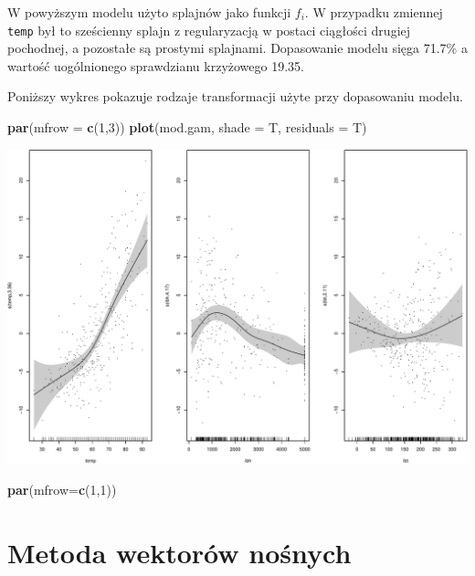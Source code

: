 \documentclass[
]{book}
\newenvironment{Shaded}{\begin{snugshade}}{\end{snugshade}}
\newcommand{\AttributeTok}[1]{\textcolor[rgb]{0.13,0.29,0.53}{#1}}
\newcommand{\DecValTok}[1]{\textcolor[rgb]{0.00,0.00,0.81}{#1}}
\newcommand{\FunctionTok}[1]{\textcolor[rgb]{0.13,0.29,0.53}{\textbf{#1}}}
\newcommand{\NormalTok}[1]{#1}
\theoremstyle{plain}
\theoremstyle{definition}
\theoremstyle{definition}
\theoremstyle{definition}
\theoremstyle{definition}
\theoremstyle{definition}
\theoremstyle{remark}
\begin{document}
W powyższym modelu użyto splajnów jako funkcji \(f_i\). W przypadku zmiennej \texttt{temp} był to sześcienny splajn z regularyzacją w postaci ciągłości drugiej pochodnej, a pozostałe są prostymi splajnami. Dopasowanie modelu sięga 71.7\% a wartość uogólnionego sprawdzianu krzyżowego 19.35.

Poniższy wykres pokazuje rodzaje transformacji użyte przy dopasowaniu modelu.

\begin{Shaded}
\begin{Highlighting}[]
\FunctionTok{par}\NormalTok{(}\AttributeTok{mfrow =} \FunctionTok{c}\NormalTok{(}\DecValTok{1}\NormalTok{,}\DecValTok{3}\NormalTok{))}
\FunctionTok{plot}\NormalTok{(mod.gam, }\AttributeTok{shade =}\NormalTok{ T, }\AttributeTok{residuals =}\NormalTok{ T)}
\end{Highlighting}
\end{Shaded}

\includegraphics{EksploracjaDanych_files/figure-latex/unnamed-chunk-85-1.pdf}

\begin{Shaded}
\begin{Highlighting}[]
\FunctionTok{par}\NormalTok{(}\AttributeTok{mfrow=}\FunctionTok{c}\NormalTok{(}\DecValTok{1}\NormalTok{,}\DecValTok{1}\NormalTok{))}
\end{Highlighting}
\end{Shaded}

\chapter{Metoda wektorów nośnych}\label{metoda-wektoruxf3w-noux15bnych}
\end{document}

